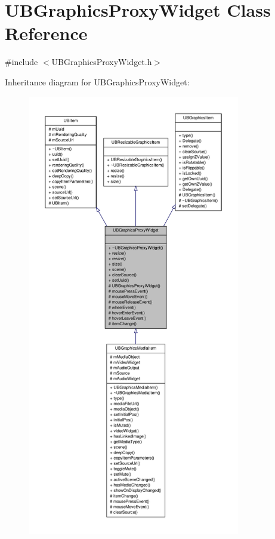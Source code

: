 \hypertarget{class_u_b_graphics_proxy_widget}{\section{U\-B\-Graphics\-Proxy\-Widget Class Reference}
\label{dd/d13/class_u_b_graphics_proxy_widget}
}


{\ttfamily \#include $<$U\-B\-Graphics\-Proxy\-Widget.\-h$>$}



Inheritance diagram for U\-B\-Graphics\-Proxy\-Widget\-:
\nopagebreak
\begin{figure}[H]
\begin{center}
\leavevmode
\includegraphics[height=550pt]{d9/d34/class_u_b_graphics_proxy_widget__inherit__graph}
\end{center}
\end{figure}


